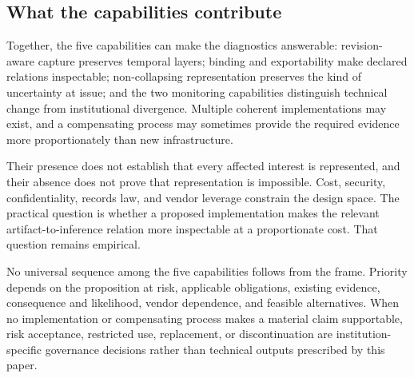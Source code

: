 \subsection{What the capabilities contribute}
\label{sec:primitives:compound}

Together, the five capabilities can make the diagnostics answerable:
revision-aware capture preserves temporal layers; binding and exportability make
declared relations inspectable; non-collapsing representation preserves the
kind of uncertainty at issue; and the two monitoring capabilities distinguish
technical change from institutional divergence. Multiple coherent
implementations may exist, and a compensating process may sometimes provide the
required evidence more proportionately than new infrastructure.

Their presence does not establish that every affected interest is represented,
and their absence does not prove that representation is impossible. Cost,
security, confidentiality, records law, and vendor leverage constrain the
design space. The practical question is whether a proposed implementation makes
the relevant artifact-to-inference relation more inspectable at a proportionate
cost. That question remains empirical.

No universal sequence among the five capabilities follows from the frame.
Priority depends on the proposition at risk, applicable obligations, existing
evidence, consequence and likelihood, vendor dependence, and feasible
alternatives. When no implementation or compensating process makes a material
claim supportable, risk acceptance, restricted use, replacement, or
discontinuation are institution-specific governance decisions rather than
technical outputs prescribed by this paper.
